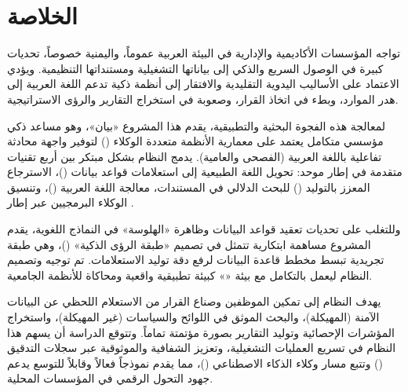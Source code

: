 \chapter*{الخلاصة}

تواجه المؤسسات الأكاديمية والإدارية في البيئة العربية عموماً، واليمنية خصوصاً،
تحديات كبيرة في الوصول السريع والذكي إلى بياناتها التشغيلية ومستنداتها
التنظيمية. ويؤدي الاعتماد على الأساليب اليدوية التقليدية والافتقار إلى أنظمة
ذكية تدعم اللغة العربية إلى هدر الموارد، وبطء في اتخاذ القرار، وصعوبة في
استخراج التقارير والرؤى الاستراتيجية.

لمعالجة هذه الفجوة البحثية والتطبيقية، يقدم هذا المشروع «بيان»، وهو مساعد
ذكي مؤسسي متكامل يعتمد على معمارية الأنظمة متعددة الوكلاء
() لتوفير واجهة محادثة تفاعلية باللغة العربية (الفصحى
والعامية). يدمج النظام بشكل مبتكر بين أربع تقنيات متقدمة في إطار موحد: تحويل
اللغة الطبيعية إلى استعلامات قواعد بيانات ()، الاسترجاع المعزز
بالتوليد () للبحث الدلالي في المستندات، معالجة اللغة العربية
()، وتنسيق الوكلاء البرمجيين عبر إطار .

وللتغلب على تحديات تعقيد قواعد البيانات وظاهرة «الهلوسة» في النماذج اللغوية،
يقدم المشروع مساهمة ابتكارية تتمثل في تصميم «طبقة الرؤى الذكية»
()، وهي طبقة تجريدية تبسط مخطط قاعدة البيانات لرفع دقة توليد
الاستعلامات. تم توجيه وتصميم النظام ليعمل بالتكامل مع بيئة
«» كبيئة تطبيقية واقعية ومحاكاة للأنظمة الجامعية.

يهدف النظام إلى تمكين الموظفين وصناع القرار من الاستعلام اللحظي عن البيانات
الآمنة (المهيكلة)، والبحث الموثق في اللوائح والسياسات (غير المهيكلة)،
واستخراج المؤشرات الإحصائية وتوليد التقارير بصورة مؤتمتة تماماً. وتتوقع
الدراسة أن يسهم هذا النظام في تسريع العمليات التشغيلية، وتعزيز الشفافية
والموثوقية عبر سجلات التدقيق () وتتبع مسار وكلاء الذكاء
الاصطناعي ()، مما يقدم نموذجاً فعالاً وقابلاً للتوسع يدعم
جهود التحول الرقمي في المؤسسات المحلية.

\clearpage

